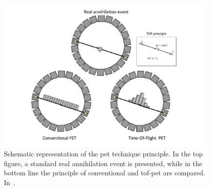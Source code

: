 \begin{table}[!htbp]
\centering
\caption{Proton-nuclear reaction channels and relative positron emitters produced in human tissues. Table reproduced from~\cite{Espana2011b}.}
\label{chap1::tab::petIsotopes}
\end{table}    

\begin{figure}[!htbp]
\centering
\includegraphics[width=0.98\textwidth]{03_GraphicFiles/chapter1_Introduction/PET_concept.pdf}
\caption{Schematic representation of the \gls{pet} technique principle. In the top figure, a standard real annihilation event is presented, while in the bottom line the principle of conventional and \gls{tof}-\gls{pet} are compared. In~\cite{Vandenberghe2016 }.}
\label{chap1::fig::PETconcept}
\end{figure}   

